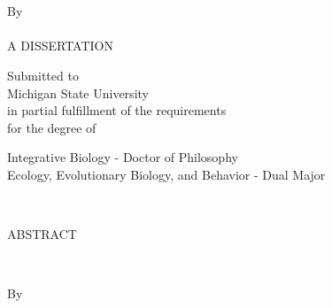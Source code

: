\documentclass[12pt,letterpaper,twoside]{report}
\begin{document}
\sloppy


\begin{titlepage}
\begin{center}
\ \\[0.5in]%
\MakeUppercase{\thesisTitle}\\
\begin{doublespace}
By\\ %
\authorName \\[4.5 in]%
A DISSERTATION \\ %
\end{doublespace}

Submitted to \\ Michigan State University \\ in partial
fulfillment of the requirements \\ 
for the degree of\\
\begin{doublespace}
\end{doublespace}


Integrative Biology - Doctor of Philosophy \\
Ecology, Evolutionary Biology, and Behavior - Dual Major
\vspace{\baselineskip}

\graduationYear\\

\end{center}
\end{titlepage}
\newpage



\pagestyle{empty}
\begin{centering}
\begin{doublespace}
ABSTRACT \\ %
\end{doublespace}
\MakeUppercase{\thesisTitle} \\ %
\begin{doublespace}
By \\ %
\authorName \\ %
\end{doublespace}
\end{centering}
\begin{doublespace}

\end{doublespace}
\newpage
\pagestyle{plain}
\end{document}
